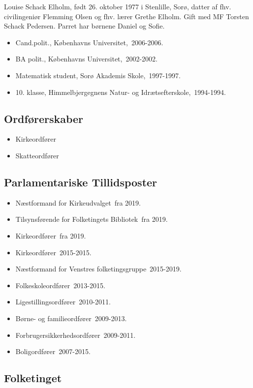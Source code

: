 \documentclass[11pt, a4paper]{awesome-cv}
\begin{document}
\makecvheader[R]
\makelettertitle
\begin{cvletter}
Louise Schack Elholm, født 26. oktober 1977 i Stenlille, Sorø, datter af fhv. civilingeniør Flemming Olsen og fhv. lærer Grethe Elholm. Gift med MF Torsten Schack Pedersen. Parret har børnene Daniel og Sofie.

\begin{itemize}
\item Cand.polit., Københavns Universitet, 2006-2006.
\item BA polit., Københavns Universitet, 2002-2002.
\item Matematisk student, Sorø Akademis Skole, 1997-1997.
\item 10. klasse, Himmelbjergegnens Natur- og Idrætsefterskole, 1994-1994.
\end{itemize}
\subsection*{Ordførerskaber}
\begin{itemize}
\item Kirkeordfører
\item Skatteordfører
\end{itemize}
\subsection*{Parlamentariske Tillidsposter}
\begin{itemize}
\item Næstformand for Kirkeudvalget fra 2019.
\item Tilsynsførende for Folketingets Bibliotek fra 2019.
\item Kirkeordfører fra 2019.
\item Kirkeordfører 2015-2015.
\item Næstformand for Venstres folketingsgruppe 2015-2019.
\item Folkeskoleordfører 2013-2015.
\item Ligestillingsordfører 2010-2011.
\item Børne- og familieordfører 2009-2013.
\item Forbrugersikkerhedsordfører 2009-2011.
\item Boligordfører 2007-2015.
\end{itemize}
\subsection*{Folketinget}

\end{cvletter}
\end{document}
